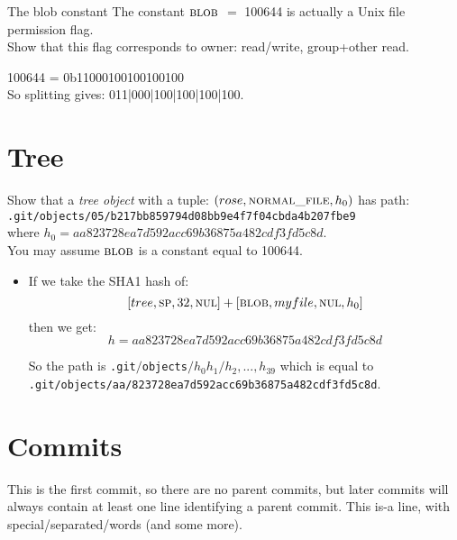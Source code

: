 \begin{sidenote}{The blob constant}
The constant $\textsc{blob}$ $=$ 100644 is actually a Unix file permission flag.\\
Show that this flag corresponds to owner: read/write, group+other read.

100644 = 0b11000100100100100\\
So splitting gives: 011|000|100|100|100|100. \\
\end{sidenote}

\section{Tree}

\frmrule 

\begin{example}
Show that a \textit{tree object} with a tuple:
$(rose,\textsc{normal\textunderscore file},h_0)$
has path:\\
\lstinline{.git/objects/05/b217bb859794d08bb9e4f7f04cbda4b207fbe9}\\
where $h_0 = aa823728ea7d592acc69b36875a482cdf3fd5c8d$.\\
You may assume $\textsc{blob}$ is a constant equal to 100644.

\begin{itemize}
\item
If we take the SHA1 hash of:
$$[tree,\textsc{sp},32,\textsc{nul}] + 
[\textsc{blob},myfile,\textsc{nul},h_0]$$
then we get:
$$h = aa823728ea7d592acc69b36875a482cdf3fd5c8d$$


So the path is \lstinline{.git}$/$\lstinline{objects}$/h_0h_1/h_2,...,h_{39}$
which is equal to \lstinline{.git/objects/aa/823728ea7d592acc69b36875a482cdf3fd5c8d}.

\end{itemize}
\end{example}


\section{Commits}




\frmrule 

This is the first commit, so there are no parent commits, 
but later commits will always contain at least one line identifying a parent commit.
This is-a line, with special/separated/words (and some more).

